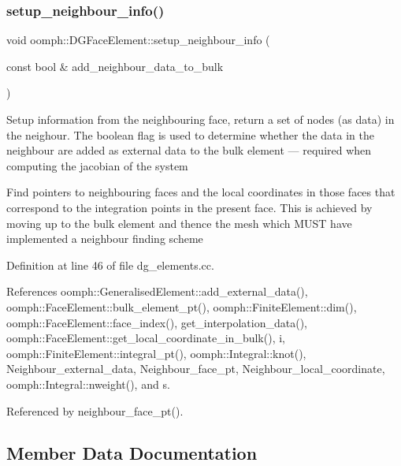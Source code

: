 \subsubsection{\texorpdfstring{setup\+\_\+neighbour\+\_\+info()}{setup\_neighbour\_info()}}
{\footnotesize\ttfamily void oomph\+::\+D\+G\+Face\+Element\+::setup\+\_\+neighbour\+\_\+info (\begin{DoxyParamCaption}\item[{const bool \&}]{add\+\_\+neighbour\+\_\+data\+\_\+to\+\_\+bulk }\end{DoxyParamCaption})}

Setup information from the neighbouring face, return a set of nodes (as data) in the neighour. The boolean flag is used to determine whether the data in the neighbour are added as external data to the bulk element --- required when computing the jacobian of the system

Find pointers to neighbouring faces and the local coordinates in those faces that correspond to the integration points in the present face. This is achieved by moving up to the bulk element and thence the mesh which M\+U\+ST have implemented a neighbour finding scheme 

Definition at line 46 of file dg\+\_\+elements.\+cc.



References oomph\+::\+Generalised\+Element\+::add\+\_\+external\+\_\+data(), oomph\+::\+Face\+Element\+::bulk\+\_\+element\+\_\+pt(), oomph\+::\+Finite\+Element\+::dim(), oomph\+::\+Face\+Element\+::face\+\_\+index(), get\+\_\+interpolation\+\_\+data(), oomph\+::\+Face\+Element\+::get\+\_\+local\+\_\+coordinate\+\_\+in\+\_\+bulk(), i, oomph\+::\+Finite\+Element\+::integral\+\_\+pt(), oomph\+::\+Integral\+::knot(), Neighbour\+\_\+external\+\_\+data, Neighbour\+\_\+face\+\_\+pt, Neighbour\+\_\+local\+\_\+coordinate, oomph\+::\+Integral\+::nweight(), and s.



Referenced by neighbour\+\_\+face\+\_\+pt().



\subsection{Member Data Documentation}
\mbox{\label{classoomph_1_1DGFaceElement_aa7fe8fcf78455ee3b01077607c91f483}} 
